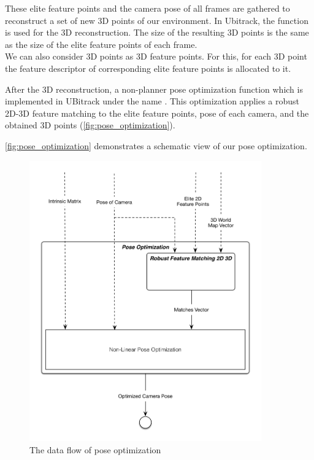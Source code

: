  
These elite feature points and the camera pose of all frames are gathered to reconstruct a set of new 3D points of our environment. In Ubitrack, the  function is used for the 3D reconstruction. The size of the resulting 3D points is the same as the size of the elite feature points of each frame. \\

We can also consider 3D points as 3D feature points. For this, for each 3D point the feature descriptor of corresponding elite feature points is allocated to it.  


After the 3D reconstruction, a non-planner pose optimization function \cite{lu2000fast} which is implemented in UBitrack under the name . This optimization applies a robust 2D-3D feature matching to the elite feature points, pose of each camera, and the obtained 3D points (\autoref{fig:pose_optimization}).  

\autoref{fig:pose_optimization} demonstrates a schematic view of our pose optimization.
\begin{figure}[H]
  \centering
  \includegraphics[width=100mm]{figures/pose_optimization}
  \caption{The data flow of pose optimization}\label{fig:pose_optimization}
\end{figure}

